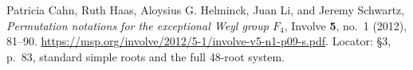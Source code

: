 Patricia Cahn, Ruth Haas, Aloysius G. Helminck, Juan Li, and Jeremy Schwartz,
\emph{Permutation notations for the exceptional Weyl group \(F_4\)},
Involve \textbf{5}, no.~1 (2012), 81--90.
\url{https://msp.org/involve/2012/5-1/involve-v5-n1-p09-s.pdf}.
Locator: \S3, p.~83, standard simple roots and the full 48-root system.

